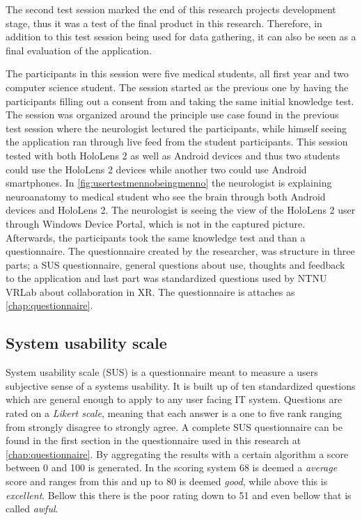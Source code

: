 The second test session marked the end of this research projects development stage, thus it was a test of the final product in this research. Therefore, in addition to this test session being used for data gathering, it can also be seen as a final evaluation of the application. 

The participants in this session were five medical students, all first year and two computer science student. The session started as the previous one by having the participants filling out a consent from and taking the same initial knowledge test. 
The session was organized around the principle use case found in the previous test session where the neurologist lectured the participants, while himself seeing the application ran through live feed from the student participants.
This session tested with both HoloLens 2 as well as Android devices and thus two students could use the HoloLens 2 devices while another two could use Android smartphones. In \autoref{fig:usertestmennobeingmenno} the neurologist is explaining neuroanatomy to medical student who see the brain through both Android devices and HoloLens 2. The neurologist is seeing the view of the HoloLens 2 user through Windows Device Portal, which is not in the captured picture.
Afterwards, the participants took the same knowledge test and than a questionnaire. The questionnaire created by the researcher, was structure in three parts; a SUS questionnaire, general questions about use, thoughts and feedback to the application and last part was standardized questions used by NTNU VRLab about collaboration in XR. The questionnaire is attaches as \autoref{chap:questionnaire}.

\subsection{System usability scale}

System usability scale (SUS) is a questionnaire meant to measure a users subjective sense of a systems usability. It is built up of ten standardized questions which are general enough to apply to any user facing IT system. Questions are rated on a \textit{Likert scale}, meaning that each answer is a one to five rank ranging from strongly disagree to strongly agree. A complete SUS questionnaire can be found in the first section in the questionnaire used in this research at \autoref{chap:questionnaire}. By aggregating the results with a certain algorithm a score between 0 and 100 is generated. In the scoring system 68 is deemed a \textit{average} score and ranges from this and up to 80 is deemed \textit{good}, while above this is \textit{excellent}. Bellow this there is the {poor} rating down to 51 and even bellow that is called \textit{awful}.